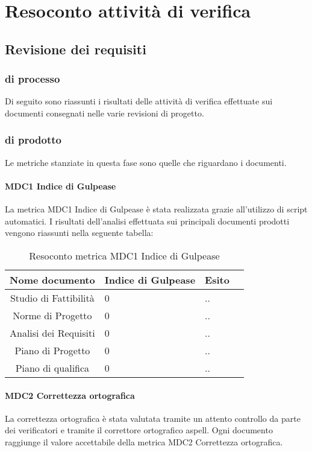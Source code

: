 \section{Resoconto attività di verifica}

\subsection{Revisione dei requisiti}

\subsubsection{ di processo}

Di seguito sono riassunti i risultati delle attività di verifica effettuate sui documenti consegnati nelle varie revisioni di progetto.

\subsubsection{ di prodotto}

Le metriche stanziate in questa fase sono quelle che riguardano i documenti.

\paragraph{MDC1 Indice di Gulpease}

La metrica MDC1 Indice di Gulpease è stata realizzata grazie all'utilizzo di script automatici. I risultati dell'analisi effettuata sui principali documenti prodotti vengono riassunti nella seguente tabella:

\begin{table}[H]
		\begin{center}
			\setlength{\aboverulesep}{0pt}
			\setlength{\belowrulesep}{0pt}
			\setlength{\extrarowheight}{.75ex}
			\begin{tabular}{ c C{4cm} C{2cm} C{3cm} }
				\textbf{Nome documento} & \textbf{Indice di Gulpease} & \textbf{Esito} \\
				\toprule
		Studio di Fattibilità & 0 & ..\\
		Norme di Progetto & 0 & ..\\
		Analisi dei Requisiti & 0 & ..\\
		Piano di Progetto & 0 & ..\\
		Piano di qualifica & 0 & ..\\
			
		\bottomrule
			\end{tabular}
			\caption{Resoconto metrica MDC1 Indice di Gulpease}
		\end{center}
	\end{table}
	
\paragraph{MDC2 Correttezza ortografica}

La correttezza ortografica è stata valutata tramite un attento controllo da parte dei verificatori e tramite il correttore ortografico aspell.  Ogni documento raggiunge il valore accettabile della metrica MDC2 Correttezza ortografica. 
